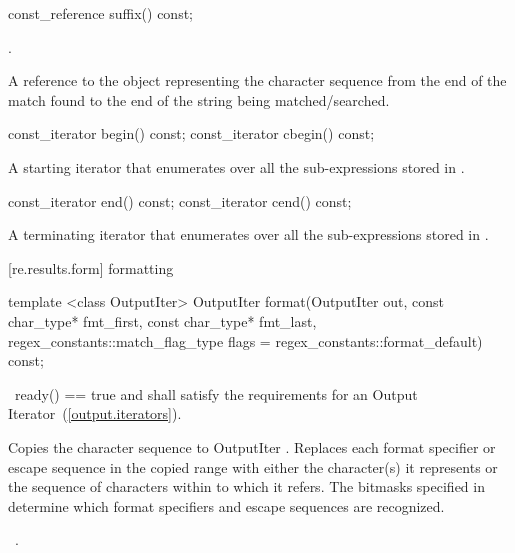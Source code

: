 %
%
\begin{itemdecl}
const_reference suffix() const;
\end{itemdecl}

\begin{itemdescr}
\pnum
\requires {}.

\pnum
\returns  A reference to the  object representing the
character sequence from the end of the match found to the end of the
string being matched/searched.  
\end{itemdescr}

%
%
\begin{itemdecl}
const_iterator begin() const;
const_iterator cbegin() const;
\end{itemdecl}

\begin{itemdescr}
\pnum\returns  A starting iterator that enumerates over all the
sub-expressions stored in .
\end{itemdescr}  

%
%
\begin{itemdecl}
const_iterator end() const;
const_iterator cend() const;
\end{itemdecl}

\begin{itemdescr}
\pnum\returns  A terminating iterator that enumerates over all the
sub-expressions stored in .  
\end{itemdescr}

[re.results.form]{ formatting}

%
%
\begin{itemdecl}
template <class OutputIter>
  OutputIter format(OutputIter out,
                    const char_type* fmt_first, const char_type* fmt_last,
                    regex_constants::match_flag_type flags =
                      regex_constants::format_default) const;
\end{itemdecl}

\begin{itemdescr}
\pnum
\requires\ ready() == true and  shall satisfy the requirements for an
Output Iterator~(\ref{output.iterators}).

\pnum
\effects Copies the character sequence  to
OutputIter .  Replaces each format specifier or escape
sequence in the copied range with either the character(s) it represents or
the sequence of characters within  to which it refers.
The bitmasks specified in  determine which format
specifiers and escape sequences are recognized.

\pnum
\returns\ .
\end{itemdescr}

